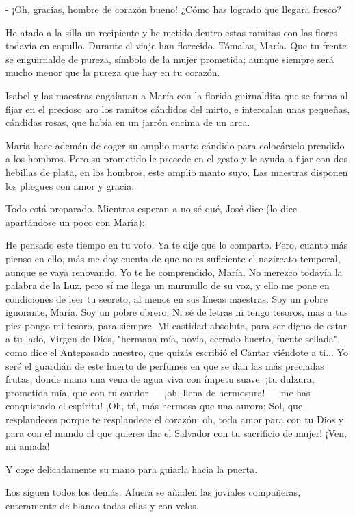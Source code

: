 \documentclass[12pt, twoside, openright]{book} %
\begin{document}
- ¡Oh, gracias, hombre de corazón bueno! ¿Cómo has logrado que llegara fresco? 

He atado a la silla un recipiente y he metido dentro estas ramitas con las flores todavía en capullo. Durante el viaje han florecido. Tómalas, María. Que tu frente se enguirnalde de pureza, símbolo de la mujer prometida; aunque siempre será mucho menor que la pureza que hay en tu corazón. 

Isabel y las maestras engalanan a María con la florida guirnaldita que se forma al fijar en el precioso aro los ramitos cándidos del mirto, e intercalan unas pequeñas, cándidas rosas, que había en un jarrón encima de un arca. 

María hace ademán de coger su amplio manto cándido para colocárselo prendido a los hombros. Pero su prometido le precede en el gesto y le ayuda a fijar con dos hebillas de plata, en los hombros, este amplio manto suyo. Las maestras disponen los pliegues con amor y gracia. 

Todo está preparado. Mientras esperan a no sé qué, José dice (lo dice apartándose un poco con María): 

He pensado este tiempo en tu voto. Ya te dije que lo comparto. Pero, cuanto más pienso en ello, más me doy cuenta de que no es suficiente el nazireato temporal, aunque se vaya renovando. Yo te he comprendido, María. No merezco todavía la palabra de la Luz, pero sí me llega un murmullo de su voz, y ello me pone en condiciones de leer tu secreto, al menos en sus líneas maestras. Soy un pobre ignorante, María. Soy un pobre obrero. Ni sé de letras ni tengo tesoros, mas a tus pies pongo mi tesoro, para siempre. Mi castidad absoluta, para ser digno de estar a tu lado, Virgen de Dios, "hermana mía, novia, cerrado huerto, fuente sellada", como dice el Antepasado nuestro, que quizás escribió el Cantar viéndote a ti... Yo seré el guardián de este huerto de perfumes en que se dan las más preciadas frutas, donde mana una vena de agua viva con ímpetu suave: ¡tu dulzura, prometida mía, que con tu candor — ¡oh, llena de hermosura! — me has conquistado el espíritu! ¡Oh, tú, más hermosa que una aurora; Sol, que resplandeces porque te resplandece el corazón; oh, toda amor para con tu Dios y para con el mundo al que quieres dar el Salvador con tu sacrificio de mujer! ¡Ven, mi amada! 

Y coge delicadamente su mano para guiarla hacia la puerta. 

Los siguen todos los demás. Afuera se añaden las joviales compañeras, enteramente de blanco todas ellas y con velos. 
\end{document}
